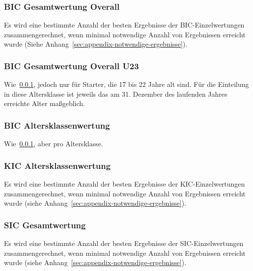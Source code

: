 \subsubsection{BIC Gesamtwertung Overall}
\label{subsec:bic-gesamtwertung-overall}
Es wird eine bestimmte Anzahl der besten Ergebnisse der BIC-Einzelwertungen zusammengerechnet, wenn minimal notwendige Anzahl von Ergebnissen erreicht wurde (Siehe Anhang~\ref{sec:appendix-notwendige-ergebnisse}).

\subsubsection{BIC Gesamtwertung Overall U23}
\label{subsec:bic-gesamtwertung-u23}
Wie~\ref{subsec:bic-gesamtwertung-overall}, jedoch nur für Starter, die 17 bis 22 Jahre alt sind. Für die Einteilung in diese Altersklasse ist jeweils das am 31. Dezember des laufenden Jahres erreichte Alter maßgeblich.

\subsubsection{BIC Altersklassenwertung}
\label{subsec:bic-ak-gesamtwertung}
Wie~\ref{subsec:bic-gesamtwertung-overall}, aber pro Altersklasse.

\subsubsection{KIC Altersklassenwertung}
\label{subsec:kic-gesamtwertung}
Es wird eine bestimmte Anzahl der besten Ergebnisse der KIC-Einzelwertungen zusammengerechnet, wenn minimal notwendige Anzahl von Ergebnissen erreicht wurde (siehe Anhang~\ref{sec:appendix-notwendige-ergebnisse}).

\subsubsection{SIC Gesamtwertung}
\label{subsec:sic-gesamtwertung}
Es wird eine bestimmte Anzahl der besten Ergebnisse der SIC-Einzelwertungen zusammengerechnet, wenn minimal notwendige Anzahl von Ergebnissen erreicht wurde (siehe Anhang~\ref{sec:appendix-notwendige-ergebnisse}).
